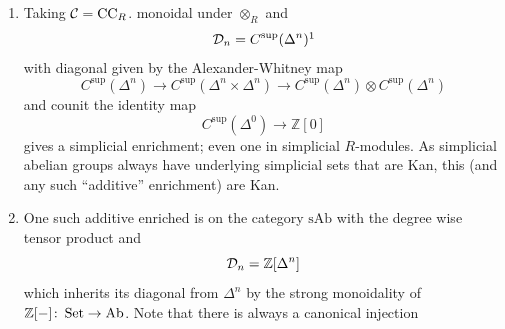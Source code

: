 \begin{enumerate}[label=\roman*)]
\begin{equation*}
                \end{equation*}
                on $\mathrm{(k)Top}$. It is Kan by the same argument we used to show that $\Sing X$ is always Kan:\\
                A horn
                \begin{equation*}
                    \begin{tikzcd}
                        X \times \gr{\horn{n}{i}} \arrow[r] \arrow[d, phantom, "\subseteq" rotate=-90] & Y \\
                        X \times \gr{\Delta^n} \arrow[ru, dashed, "\exists"']           &        
                    \end{tikzcd}
                \end{equation*}
                can be filled since $\gr{\horn{n}{i}}$ is a retract of $\gr{\Delta^n}$.
            \item 
                Taking $\mathcal{C} = \mathrm{CC}_R$. monoidal under $\otimes_R$ and
                \begin{equation*}
                    \Dd_n = C^{\sup}(\Delta^n)\footnotemark
                \end{equation*}
                with diagonal given by the Alexander-Whitney map
                \begin{equation*}
                    C^{\sup}(\Delta^n) \to C^{\sup}(\Delta^n \times \Delta^n) \to C^{\sup}(\Delta^n) \otimes C^{\sup}(\Delta^n)
                \end{equation*}
                and counit the identity map
                \begin{equation*}
                    C^{\sup}(\Delta^0) \to \mathbb{Z}[0]
                \end{equation*}
                gives a simplicial enrichment; even one in simplicial $R$-modules. As simplicial abelian groups always have underlying simplicial sets that are Kan, this (and any such ``additive'' enrichment) are Kan.
            \item 
                One such additive enriched is on the category $\mathrm{sAb}$ with the degree wise tensor product and
                \begin{equation*}
                    \mathcal{D}_n = \mathbb{Z}[\Delta^n]
                \end{equation*}
                which inherits its diagonal from $\Delta^n$ by the strong monoidality of $\mathbb{Z}[-] \colon \operatorname{Set} \to \operatorname{Ab}$. Note that there is always a canonical injection

\end{enumerate}
